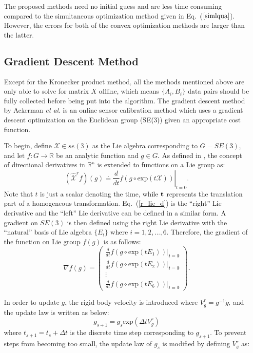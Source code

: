 \documentclass[twocolumn,10pt]{asme2ej}
\newcommand{\ttt}{{\bf t}}
\begin{document}
The proposed methods need no initial guess and are less time consuming compared to the simultaneous optimization method given in Eq.~($\ref{simlqua}$). However, the errors for both of the convex optimization methods are larger than the latter. 
\subsection{Gradient Descent Method}
Except for the Kronecker product method, all the methods mentioned above are only able to solve for matrix $X$ offline, which means $\{A_{i}, B_{i}\}$ data pairs should be fully collected before being put into the algorithm. The gradient descent method \cite{ackerman2014online} by Ackerman {\it et al.} is an online sensor calibration method which uses a gradient descent optimization on the Euclidean group (SE(3)) given an appropriate cost function. 

To begin, define $\mathcal{X} \in se(3)$ as the Lie algebra corresponding to $G = SE(3)$, and let $f:G \rightarrow \mathbb{R}$ be an analytic function and $g \in G$. As defined in \cite{myoldbook}, the concept of directional derivatives in $\mathbb{R}^{n}$ is extended to functions on a Lie group as:
\begin{equation}
\left.(\hat{\mathcal{X}}^{r}f)(g)\doteq \dfrac{d}{dt}f(g\circ \text{exp}(t\mathcal{X}))\right\vert_{t=0}.
\label{r_lie_d}
\end{equation}
Note that $t$ is just a scalar denoting the time, while $\ttt$ represents the translation part of a homogeneous transformation.
Eq.~(\ref{r_lie_d}) is the ``right'' Lie derivative and the ``left'' Lie derivative can be defined in a similar form. A gradient on $SE(3)$ is then defined using the right Lie derivative with the ``natural'' basis of Lie algebra $\{E_{i}\}$ where $i = 1,2,...,6$. Therefore, the gradient of the function on Lie group $f(g)$ is as follows:
\begin{equation}
\nabla f(g)= \left( 
\begin{matrix}
\frac{d}{dt}\left.f(g\circ \text{exp}(tE_{1}))\right\vert _{t=0} \\
\frac{d}{dt}\left.f(g\circ \text{exp}(tE_{2}))\right\vert _{t=0} \\
\vdots \\
\frac{d}{dt}\left.f(g\circ \text{exp}(tE_{6}))\right\vert _{t=0}
\end{matrix}
\right).
\end{equation}

In order to update $g$, the rigid body velocity is introduced where $V^{r}_{g} = g^{-1}\dot{g}$, and the update law is written as below:
\begin{equation}
g_{s+1} = g_{s}\text{exp}(\Delta t V^{r}_{g})
\end{equation}
where $t_{s+1} = t_{s} + \Delta t$ is the discrete time step corresponding to $g_{s+1}$. To prevent steps from becoming too small, the update law of $g_s$ is modified by defining $V^{r}_{g}$ as:
 
\end{document}
